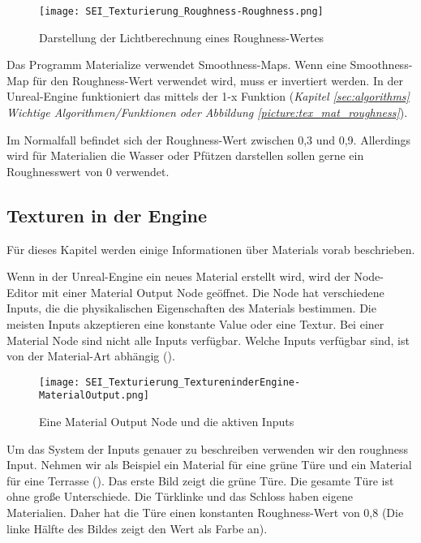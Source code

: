 {\begin{figure}[H]
    \centering
    \texttt{[image: SEI\_Texturierung\_Roughness-Roughness.png]}
    \caption{Darstellung der Lichtberechnung eines Roughness-Wertes}
    \label{picture:roughness_illustration}
\end{figure}


Das Programm Materialize verwendet Smoothness-Maps. Wenn eine Smoothness-Map für den Roughness-Wert verwendet wird,
muss er invertiert werden. In der Unreal-Engine funktioniert das mittels der 1-x Funktion
(\textit{Kapitel \ref{sec:algorithms} Wichtige Algorithmen/Funktionen oder Abbildung \ref{picture:tex_mat_roughness}}).

Im Normalfall befindet sich der Roughness-Wert zwischen 0,3 und 0,9. Allerdings wird für Materialien die Wasser oder
Pfützen darstellen sollen gerne ein Roughnesswert von 0 verwendet.

\subsection{Texturen in der Engine}
\label{sec:tex_inside_engine}

Für dieses Kapitel werden einige Informationen über Materials vorab beschrieben.


Wenn in der Unreal-Engine ein neues Material erstellt wird, wird der Node-Editor\citep{ue:node_introduction} mit einer
Material Output Node geöffnet. Die Node hat verschiedene Inputs, die die physikalischen Eigenschaften des Materials
bestimmen. Die meisten Inputs akzeptieren eine konstante Value oder eine Textur. Bei einer Material Node sind nicht
alle Inputs verfügbar. Welche Inputs verfügbar sind, ist von der Material-Art abhängig
().

\begin{figure}[H]
    \centering
    \texttt{[image: SEI\_Texturierung\_TextureninderEngine-MaterialOutput.png]}
    \caption{Eine Material Output Node und die aktiven Inputs}
    \label{picture:mat_ue4_node}
\end{figure}


Um das System der Inputs genauer zu beschreiben verwenden wir den roughness Input. Nehmen wir als Beispiel ein Material
für eine grüne Türe und ein Material für eine Terrasse ().
Das erste Bild zeigt die grüne Türe. Die gesamte Türe ist ohne große Unterschiede. Die Türklinke und das Schloss haben
eigene Materialien. Daher hat die Türe einen konstanten Roughness-Wert von 0,8 (Die linke Hälfte des Bildes zeigt
den Wert als Farbe an).

}
